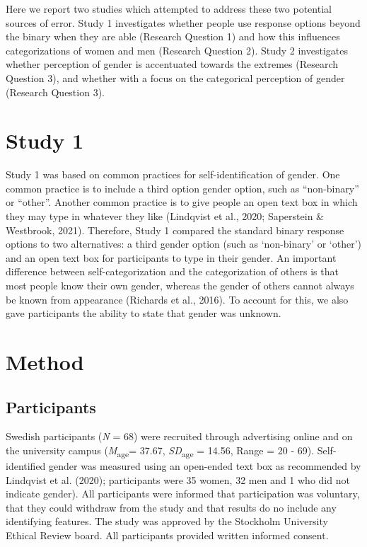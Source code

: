\documentclass[
  man]{apa7}
\begin{document}
Here we report two studies which attempted to address these two potential sources of error. Study 1 investigates whether people use response options beyond the binary when they are able (Research Question 1) and how this influences categorizations of women and men (Research Question 2). Study 2 investigates whether perception of gender is accentuated towards the extremes (Research Question 3), and whether with a focus on the categorical perception of gender (Research Question 3).

\hypertarget{study-1}{%
\section{Study 1}\label{study-1}}

Study 1 was based on common practices for self-identification of gender. One common practice is to include a third option gender option, such as ``non-binary'' or ``other''. Another common practice is to give people an open text box in which they may type in whatever they like (Lindqvist et al., 2020; Saperstein \& Westbrook, 2021). Therefore, Study 1 compared the standard binary response options to two alternatives: a third gender option (such as `non-binary' or `other') and an open text box for participants to type in their gender. An important difference between self-categorization and the categorization of others is that most people know their own gender, whereas the gender of others cannot always be known from appearance (Richards et al., 2016). To account for this, we also gave participants the ability to state that gender was unknown.

\hypertarget{method}{%
\section{Method}\label{method}}

\hypertarget{participants}{%
\subsection{Participants}\label{participants}}

Swedish participants (\emph{N} = 68) were recruited through advertising online and on the university campus (\emph{M}\textsubscript{age}= 37.67, \emph{SD}\textsubscript{age} = 14.56, Range = 20 - 69). Self-identified gender was measured using an open-ended text box as recommended by Lindqvist et al. (2020); participants were 35 women, 32 men and 1 who did not indicate gender). All participants were informed that participation was voluntary, that they could withdraw from the study and that results do no include any identifying features. The study was approved by the Stockholm University Ethical Review board. All participants provided written informed consent.
\end{document}
